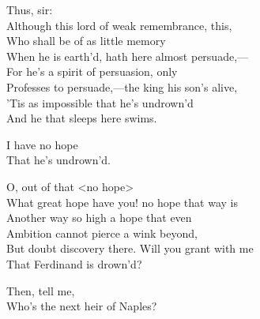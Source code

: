 \begin{verse_speech}[Antonio] 
Thus, sir:\\
Although this lord of weak remembrance, this,\\
Who shall be of as little memory\\
When he is earth'd, hath here almost persuade,—\\
For he's a spirit of persuasion, only\\
Professes to persuade,—the king his son's alive,\\
'Tis as impossible that he's undrown'd\\
And he that sleeps here swims.
\end{verse_speech}

\begin{verse_speech}[Sebastian] 
I have no hope\\
That he's undrown'd.
\end{verse_speech}

\begin{verse_speech}[Antonio] 
O, out of that <no hope>\\
What great hope have you! no hope that way is\\
Another way so high a hope that even\\
Ambition cannot pierce a wink beyond,\\
But doubt discovery there. Will you grant with me\\
That Ferdinand is drown'd?
\end{verse_speech}

\begin{verse_speech}[Antonio] 
Then, tell me,\\
Who's the next heir of Naples?
\end{verse_speech}


